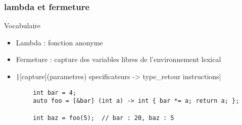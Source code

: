\documentclass[C++.tex]{subfiles}
\begin{document}
\begin{frame}[fragile]
	\frametitle{lambda et fermeture}
	\begin{block}{Vocabulaire}
		\begin{itemize}
			\item Lambda : fonction anonyme
			\item Fermeture : capture des variables libres de l'environnement lexical
		\end{itemize}
	\end{block}

	\begin{itemize}
		\item \texttt|[capture](parametres) specificateurs -> type_retour {instructions}|
	\end{itemize}

	\begin{verbatim}
		int bar = 4;
		auto foo = [&bar] (int a) -> int { bar *= a; return a; };

		int baz = foo(5);  // bar : 20, baz : 5
	\end{verbatim}
\end{frame}
\end{document}
